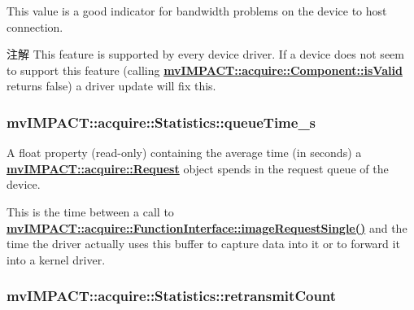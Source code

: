 This value is a good indicator for bandwidth problems on the device to host connection.

\begin{DoxyNote}{注解}
This feature is supported by every device driver. If a device does not seem to support this feature (calling {\bfseries \hyperlink{classmv_i_m_p_a_c_t_1_1acquire_1_1_component_ac51e55e7e046101f3c6119d84123abd5}{mv\+I\+M\+P\+A\+C\+T\+::acquire\+::\+Component\+::is\+Valid}} returns false) a driver update will fix this. 
\end{DoxyNote}
\hypertarget{classmv_i_m_p_a_c_t_1_1acquire_1_1_statistics_aad94af2739fc56bcd30f5fd062dd6374}{
\subsubsection[{queue\+Time\+\_\+s}]{ mv\+I\+M\+P\+A\+C\+T\+::acquire\+::\+Statistics\+::queue\+Time\+\_\+s}}\label{classmv_i_m_p_a_c_t_1_1acquire_1_1_statistics_aad94af2739fc56bcd30f5fd062dd6374}


A float property {\bfseries }(read-\/only) containing the average time (in seconds) a {\bfseries \hyperlink{classmv_i_m_p_a_c_t_1_1acquire_1_1_request}{mv\+I\+M\+P\+A\+C\+T\+::acquire\+::\+Request}} object spends in the request queue of the device. 

This is the time between a call to {\bfseries \hyperlink{classmv_i_m_p_a_c_t_1_1acquire_1_1_function_interface_a59571120b5e81c3af596ea5da5dc63ba}{mv\+I\+M\+P\+A\+C\+T\+::acquire\+::\+Function\+Interface\+::image\+Request\+Single()}} and the time the driver actually uses this buffer to capture data into it or to forward it into a kernel driver. \hypertarget{classmv_i_m_p_a_c_t_1_1acquire_1_1_statistics_a2671816bdd4ada13dae8930029510be1}{
\subsubsection[{retransmit\+Count}]{ mv\+I\+M\+P\+A\+C\+T\+::acquire\+::\+Statistics\+::retransmit\+Count}}\label{classmv_i_m_p_a_c_t_1_1acquire_1_1_statistics_a2671816bdd4ada13dae8930029510be1}


